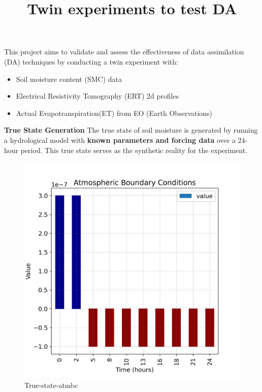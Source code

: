 \documentclass{article}
\title{Twin experiments to test DA}
\date{\displaydate{articleDate}}
\author{}
\begin{document}
\maketitle
\keywords{}

This project aims to validate and assess the effectiveness of data assimilation (DA) techniques by conducting a twin experiment with:

\begin{itemize}
\item Soil moisture content (SMC) data
\item Electrical Resistivity Tomography (ERT) 2d profiles
\item Actual Evapotranspiration(ET) from EO (Earth Observations)
\end{itemize}

\textbf{True State Generation}
The true state of soil moisture is generated by running a hydrological model with \textbf{known parameters and forcing data} over a 24-hour period. This true state serves as the synthetic reality for the experiment.

\begin{figure}[!htbp]
\centering
\includegraphics[width=0.75\linewidth]{files/atmbc-f09b5504b84b8c8eec07ec45739288f2.png}
\caption[]{True-state-atmbc}
\label{true-state-atmbc}
\end{figure}
\end{document}
